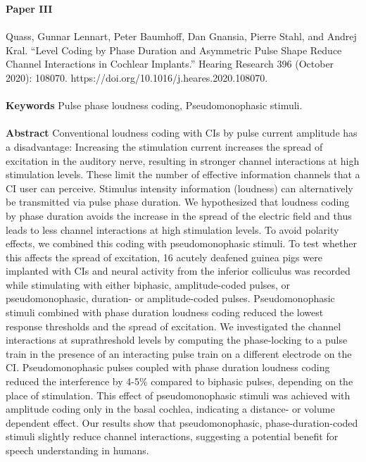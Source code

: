 
\textbf{Paper III} 
\\ \\
\noindent
Quass, Gunnar Lennart, Peter Baumhoff, Dan Gnansia, Pierre Stahl, and Andrej Kral. “Level Coding by Phase Duration and Asymmetric Pulse Shape Reduce Channel Interactions in Cochlear Implants.” Hearing Research 396 (October 2020): 108070. https://doi.org/10.1016/j.heares.2020.108070. \\ \\

\noindent
\textbf{Keywords} Pulse phase loudness coding, Pseudomonophasic stimuli. \\ \\

\noindent
\textbf{Abstract} Conventional loudness coding with CIs by pulse current amplitude has a disadvantage: Increasing the stimulation current increases the spread of excitation in the auditory nerve, resulting in stronger channel interactions at high stimulation levels. These limit the number of effective information channels that a CI user can perceive. Stimulus intensity information (loudness) can alternatively be transmitted via pulse phase duration. We hypothesized that loudness coding by phase duration avoids the increase in the spread of the electric ﬁeld and thus leads to less channel interactions at high stimulation levels. To avoid polarity effects, we combined this coding with pseudomonophasic stimuli. To test whether this affects the spread of excitation, 16 acutely deafened guinea pigs were implanted with CIs and neural activity from the inferior colliculus was recorded while stimulating with either biphasic, amplitude-coded pulses, or pseudomonophasic, duration- or amplitude-coded pulses. Pseudomonophasic stimuli combined with phase duration loudness coding reduced the lowest response thresholds and the spread of excitation. We investigated the channel interactions at suprathreshold levels by computing the phase-locking to a pulse train in the presence of an interacting pulse train on a different electrode on the CI. Pseudomonophasic pulses coupled with phase duration loudness coding reduced the interference by 4-5\% compared to biphasic pulses, depending on the place of stimulation. This effect of pseudomonophasic stimuli was achieved with amplitude coding only in the basal cochlea, indicating a distance- or volume dependent effect. Our results show that pseudomonophasic, phase-duration-coded stimuli slightly reduce channel interactions, suggesting a potential beneﬁt for speech understanding in humans. \\ \\

